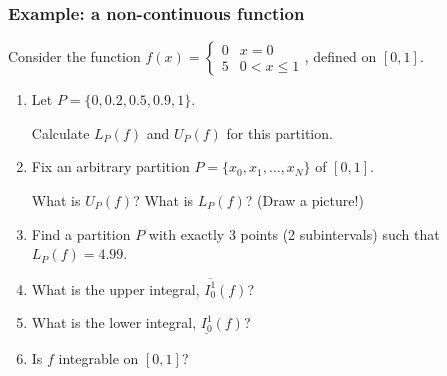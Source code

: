 \documentclass[14pt]{beamer}
\newcommand{\setsize}[1]{\fontsize{#1}{#1}\selectfont} %
\newcommand{\smallerfont}{\setsize{13}} %
\begin{document}
	\begin{frame}[t]
		\smallerfont
		\frametitle{Example: a non-continuous function}

		Consider the function \;
		${\displaystyle f(x) = \begin{cases}0 & x = 0 \\ 5 & 0 < x \leq 1\end{cases}}$,
		\;defined on $[0,1]$.

		\begin{enumerate}
			\item Let ${\displaystyle P = \{0, 0.2, 0.5, 0.9, 1 \}}$.
				\vspace{.1cm}

				Calculate ${\displaystyle L_P(f)}$ and ${\displaystyle U_P(f)}$ for this
				partition.
				\vspace{.1cm}

			\item Fix an arbitrary partition $P = \{x_{0}, x_{1}, \dots, x_{N}\}$ of $[
				0,1]$. \\
				\vspace{.1cm}

				What is $U_{P}(f)$? What is ${\displaystyle L_P(f)}$? (Draw a picture!)
				\vspace{.1cm}

			\item Find a partition $P$ with exactly 3 points (2 subintervals) such that
				${\displaystyle L_P(f) = 4.99}$.

			\item What is the upper integral, $\overline{I_0^1}(f)$?

			\item What is the lower integral, $\underline{I_0^1}(f)$?

			\item Is $f$ integrable on $[0,1]$?
		\end{enumerate}
	\end{frame}
\end{document}
